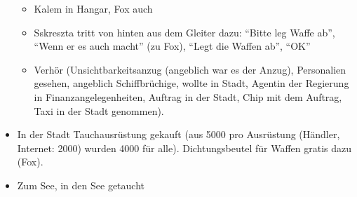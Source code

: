\documentclass[11pt]{article}
\begin{document}
\begin{itemize}
  \begin{itemize}
  \item
    Kalem in Hangar, Fox auch
  \item
    Sskreszta tritt von hinten aus dem Gleiter dazu: ``Bitte leg Waffe
    ab'', ``Wenn er es auch macht'' (zu Fox), ``Legt die Waffen ab'',
    ``OK''
  \item
    Verhör (Unsichtbarkeitsanzug (angeblich war es der Anzug),
    Personalien gesehen, angeblich Schiffbrüchige, wollte in Stadt,
    Agentin der Regierung in Finanzangelegenheiten, Auftrag in der
    Stadt, Chip mit dem Auftrag, Taxi in der Stadt genommen).
  \end{itemize}
\item
  In der Stadt Tauchausrüstung gekauft (aus 5000 pro Ausrüstung
  (Händler, Internet: 2000) wurden 4000 für alle). Dichtungsbeutel für
  Waffen gratis dazu (Fox).
\item
  Zum See, in den See getaucht


\end{itemize}
\end{document}

